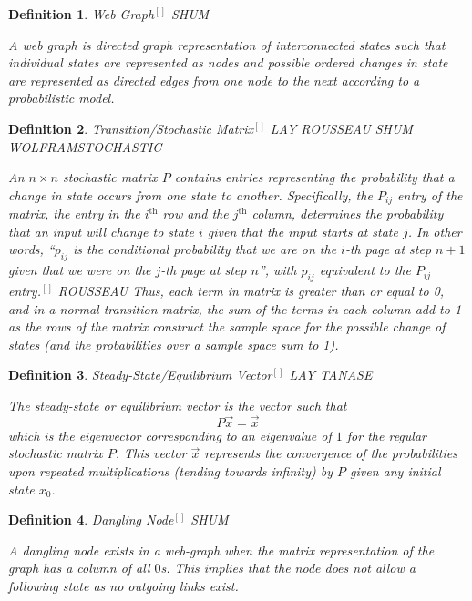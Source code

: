 \documentclass{article}
\newtheorem{definition}{Definition}
\begin{document}
    \begin{definition}{Web Graph$^{[]}$ SHUM}
    
    \noindent
    \textup{A web graph is directed graph representation of interconnected states such that individual states are represented as nodes and possible ordered changes in state are represented as directed edges from one node to the next according to a probabilistic model.}
    
    \end{definition}
    
    \begin{definition}{Transition/Stochastic Matrix$^{[]}$ LAY ROUSSEAU SHUM WOLFRAMSTOCHASTIC}
    
    \noindent
    \textup{An $n \times n$ stochastic matrix $P$ contains entries representing the probability that a change in state occurs from one state to another. Specifically, the $P_{ij}$ entry of the matrix, the entry in the $i^\text{th}$ row and the $j^\text{th}$ column, determines the probability that an input will change to state $i$ given that the input starts at state $j$. In other words, ``$p_{ij}$ is the conditional probability that we are on the $i$-th page at step $n+1$ given that we were on the $j$-th page at step $n$'', with $p_{ij}$ equivalent to the $P_{ij}$ entry.$^{[]}$ ROUSSEAU Thus, each term in matrix is greater than or equal to 0, and in a normal transition matrix, the sum of the terms in each column add to 1 as the rows of the matrix construct the sample space for the possible change of states (and the probabilities over a sample space sum to 1).}
    
    \end{definition}
    
    \begin{definition}{Steady-State/Equilibrium Vector$^{[]}$ LAY TANASE}
    
    \noindent
    \textup{The steady-state or equilibrium vector is the vector such that $$P \Vec{x} = \Vec{x}$$ which is the eigenvector corresponding to an eigenvalue of $1$ for the regular stochastic matrix $P$. This vector $\Vec{x}$ represents the convergence of the probabilities upon repeated multiplications (tending towards infinity) by $P$ given any initial state $x_0$.}
    
    \end{definition}
    
    \begin{definition}{Dangling Node$^{[]}$ SHUM}
    
    \noindent
    \textup{A dangling node exists in a web-graph when the matrix representation of the graph has a column of all $0$s. This implies that the node does not allow a following state as no outgoing links exist.}
    
    \end{definition}
    
\end{document}
